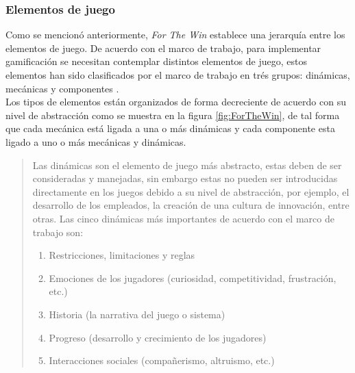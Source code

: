 \subsubsection{Elementos de juego}

 \noindent Como se mencionó anteriormente, {\em For The Win} establece una jerarquía entre los
 elementos de juego. De acuerdo con el marco de trabajo, para implementar gamificación se
 necesitan contemplar distintos elementos de juego, estos elementos han sido clasificados por
 el marco de trabajo en trés grupos: dinámicas, mecánicas y componentes \cite[pp. 55-57]{ForTheWin}.\\

 \noindent Los tipos de elementos  están organizados de forma decreciente de acuerdo con su nivel
 de abstracción como se muestra en la figura \ref{fig:ForTheWin}, de tal forma que cada mecánica
 está ligada a una o más dinámicas y cada componente esta ligado a uno o más mecánicas y
 dinámicas.\\


 \begin{quote}
    Las dinámicas son el elemento de juego más abstracto, estas deben de ser consideradas y
    manejadas, sin embargo estas no pueden ser introducidas directamente en los juegos debido
    a su nivel de abstracción, por ejemplo, el desarrollo de los empleados, la creación de una
    cultura de innovación, entre otras. Las cinco dinámicas más importantes de acuerdo con el
    marco de trabajo son:

    \begin{enumerate}
        \item Restricciones, limitaciones y reglas
        \item Emociones de los jugadores (curiosidad, competitividad, frustración, etc.)
        \item Historia (la narrativa del juego o sistema)
        \item Progreso (desarrollo y crecimiento de los jugadores)
        \item Interacciones sociales (compañerismo, altruismo, etc.)
    \end{enumerate}

 \end{quote}

 \clearpage

